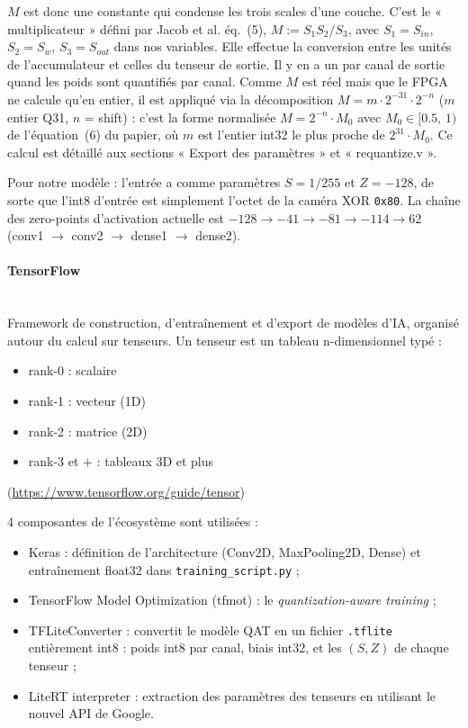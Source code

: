 \documentclass[11pt,a4paper]{article}
\begin{document}
$M$ est donc une constante qui condense les trois scales d'une couche. C'est
le « multiplicateur » défini par Jacob et al. éq.~(5),
$M := S_1 S_2 / S_3$, avec $S_1 = S_{in}$, $S_2 = S_w$, $S_3 = S_{out}$ dans
nos variables. Elle effectue la conversion entre les unités de
l'accumulateur et celles du tenseur de sortie. Il y en a un par canal de
sortie quand les poids sont quantifiés par canal. Comme $M$ est réel mais que
le FPGA ne calcule qu'en entier, il est appliqué via la décomposition
$M = m \cdot 2^{-31} \cdot 2^{-n}$ ($m$ entier Q31, $n$ = shift) : c'est la
forme normalisée $M = 2^{-n} \cdot M_0$ avec $M_0 \in [0.5,\, 1)$ de
l'équation~(6) du papier, où $m$ est l'entier int32 le plus proche de
$2^{31} \cdot M_0$. Ce calcul est détaillé aux sections « Export des
paramètres » et « requantize.v ».

Pour notre modèle : l'entrée a comme paramètres $S = 1/255$ et $Z = -128$, de
sorte que l'int8 d'entrée est simplement l'octet de la caméra XOR
\texttt{0x80}. La chaîne des zero-points d'activation actuelle est
$-128 \to -41 \to -81 \to -114 \to 62$ (conv1 $\to$ conv2 $\to$ dense1 $\to$
dense2).

\paragraph{TensorFlow}\mbox{}\\

Framework de construction, d'entraînement et d'export de modèles d'IA,
organisé autour du calcul sur tenseurs. Un tenseur est un tableau
n-dimensionnel typé :
\begin{itemize}
  \item rank-0 : scalaire
  \item rank-1 : vecteur (1D)
  \item rank-2 : matrice (2D)
  \item rank-3 et $+$ : tableaux 3D et plus
\end{itemize}
(\url{https://www.tensorflow.org/guide/tensor})

4 composantes de l'écosystème sont utilisées :
\begin{itemize}
  \item Keras : définition de l'architecture (Conv2D, MaxPooling2D, Dense) et
    entraînement float32 dans \texttt{training\_script.py} ;
  \item TensorFlow Model Optimization (tfmot) : le \emph{quantization-aware
    training} ;
  \item TFLiteConverter : convertit le modèle QAT en un fichier
    \texttt{.tflite} entièrement int8 : poids int8 par canal, biais int32, et
    les $(S, Z)$ de chaque tenseur ;
  \item LiteRT interpreter : extraction des paramètres des tenseurs en
    utilisant le nouvel API de Google.
\end{itemize}
\end{document}
